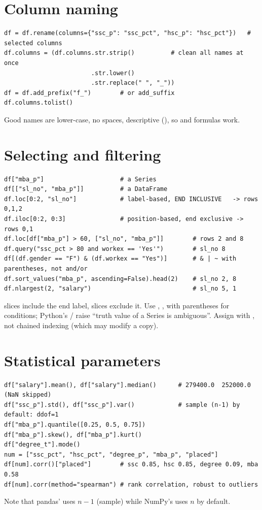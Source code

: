 \section{Column naming}
\begin{lstlisting}
df = df.rename(columns={"ssc_p": "ssc_pct", "hsc_p": "hsc_pct"})   # selected columns
df.columns = (df.columns.str.strip()          # clean all names at once
                        .str.lower()
                        .str.replace(" ", "_"))
df = df.add_prefix("f_")        # or add_suffix
df.columns.tolist()
\end{lstlisting}
Good names are lower-case, no spaces, descriptive (), so  and formulas work.

\section{Selecting and filtering}
\begin{lstlisting}
df["mba_p"]                     # a Series
df[["sl_no", "mba_p"]]          # a DataFrame
df.loc[0:2, "sl_no"]            # label-based, END INCLUSIVE   -> rows 0,1,2
df.iloc[0:2, 0:3]               # position-based, end exclusive -> rows 0,1
df.loc[df["mba_p"] > 60, ["sl_no", "mba_p"]]        # rows 2 and 8
df.query("ssc_pct > 80 and workex == 'Yes'")        # sl_no 8
df[(df.gender == "F") & (df.workex == "Yes")]       # & | ~ with parentheses, not and/or
df.sort_values("mba_p", ascending=False).head(2)    # sl_no 2, 8
df.nlargest(2, "salary")                            # sl_no 5, 1
\end{lstlisting}
\begin{trap}
 slices include the end label,  slices exclude it. Use \code{\&}, \code{|}, \code{\textasciitilde} with parentheses for conditions; Python's
/ raise ``truth value of a Series is ambiguous''. Assign with , not chained indexing
 (which may modify a copy).
\end{trap}

\section{Statistical parameters}
\begin{lstlisting}
df["salary"].mean(), df["salary"].median()      # 279400.0  252000.0   (NaN skipped)
df["ssc_p"].std(), df["ssc_p"].var()            # sample (n-1) by default: ddof=1
df["mba_p"].quantile([0.25, 0.5, 0.75])
df["mba_p"].skew(), df["mba_p"].kurt()
df["degree_t"].mode()
num = ["ssc_pct", "hsc_pct", "degree_p", "mba_p", "placed"]
df[num].corr()["placed"]        # ssc 0.85, hsc 0.85, degree 0.09, mba 0.58
df[num].corr(method="spearman") # rank correlation, robust to outliers
\end{lstlisting}
Note that pandas'  uses $n-1$ (sample) while NumPy's  uses $n$ by default.

